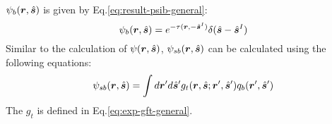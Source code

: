 \documentclass [10pt,letterpaper]{article}
\newcommand{\unitvectorsym}[1]{\hat{\vectorsym{#1}}}
\begin{document}
$\psi_b(\vectorsym{r},\unitvectorsym{s})$ is given by Eq.\eqref{eq:result-psib-general}:
\begin{equation} \label{eq:result-psib-general-2ndtime}
	\psi_b(\vectorsym{r},\unitvectorsym{s})
	=
	e^{-\tau(\vectorsym{r},-\unitvectorsym{s}^I)}
	\delta(\unitvectorsym{s}-\unitvectorsym{s}^I)
\end{equation}
Similar to the calculation of $\psi(\vectorsym{r},\unitvectorsym{s})$, $\psi_{sb}(\vectorsym{r},\unitvectorsym{s})$ can be calculated using the following equations:
\begin{equation} \label{eq:der-psisb-general}
	\psi_{sb}(\vectorsym{r},\unitvectorsym{s})
	=
	\int d\vectorsym{r}^\prime d\unitvectorsym{s}^\prime
	g_t(\vectorsym{r},\unitvectorsym{s};\vectorsym{r}^\prime,\unitvectorsym{s}^\prime) 
	q_b(\vectorsym{r}^\prime,\unitvectorsym{s}^\prime) 
\end{equation}
The $g_t$ is defined in Eq.\eqref{eq:exp-gft-general}.
\end{document}
